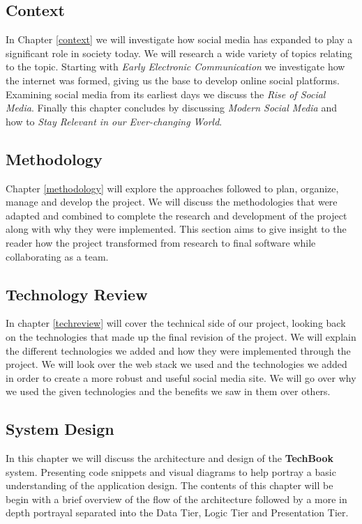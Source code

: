 \subsection{Context}
In Chapter \ref{context} we will investigate how social media has expanded to play a significant role in society today. We will research a wide variety of topics relating to the topic. Starting with \textit{Early Electronic Communication} we investigate how the internet was formed, giving us the base to develop online social platforms. Examining social media from its earliest days we discuss the \textit{Rise of Social Media}. Finally this chapter concludes by discussing \textit{Modern Social Media} and how to \textit{Stay Relevant in our Ever-changing World}.

\subsection{Methodology}
Chapter \ref{methodology} will explore the approaches followed to plan, organize, manage and develop the project. We will discuss the methodologies that were adapted and combined to complete the research and development of the project along with why they were implemented. This section aims to give insight to the reader how the project transformed from research to final software while collaborating as a team.

\subsection{Technology Review}
In chapter \ref{techreview} will cover the technical side of our project, looking back on the technologies that made up the final revision of the project. We will explain the different technologies we added and how they were implemented through the project. We will look over the web stack we used and the technologies we added in order to create a more robust and useful social media site. We will go over why we used the given technologies and the benefits we saw in them over others.

\subsection{System Design}
In this chapter we will discuss the architecture and design of the \textbf{TechBook} system. Presenting code snippets and visual diagrams to help portray a basic understanding of the application design. The contents of this chapter will be begin with a brief overview of the flow of the architecture followed by a more in depth portrayal separated into the Data Tier, Logic Tier and Presentation Tier.

